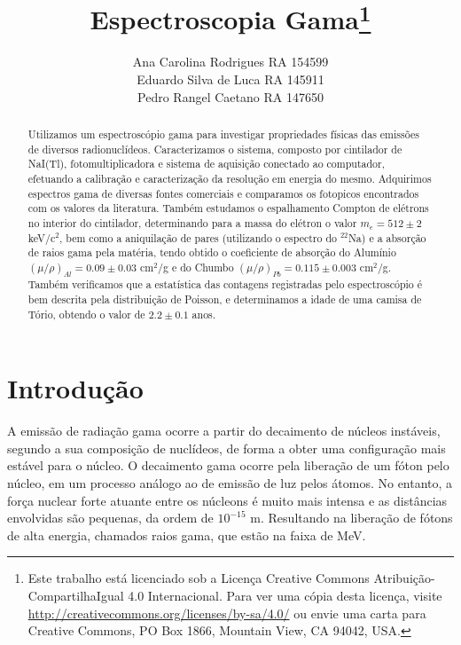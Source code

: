 \documentclass[a4paper, 11pt, notitlepage]{article}
\numberwithin{equation}{section}  %
\begin{document}
\title{Espectroscopia Gama\footnote{Este trabalho está licenciado sob a Licença Creative Commons Atribuição-CompartilhaIgual 4.0 Internacional. Para ver uma cópia desta licença, visite \url{http://creativecommons.org/licenses/by-sa/4.0/} ou envie uma carta para Creative Commons, PO Box 1866, Mountain View, CA 94042, USA.}}
\author{Ana Carolina Rodrigues RA 154599\\ Eduardo Silva de Luca RA 145911\\ Pedro Rangel Caetano RA 147650\\}

\maketitle

\begin{abstract}
Utilizamos um espectroscópio gama para investigar propriedades físicas das emissões de diversos radionuclídeos. Caracterizamos o sistema, composto por cintilador de NaI(Tl), fotomultiplicadora e sistema de aquisição conectado ao computador, efetuando a calibração e caracterização da resolução em energia do mesmo. Adquirimos espectros gama de diversas fontes comerciais e comparamos os fotopicos encontrados com os valores da literatura. Também estudamos o espalhamento Compton de elétrons no interior do cintilador, determinando para a massa do elétron o valor $m_e = 512 \pm 2$ keV/c$^2$, bem como a aniquilação de pares (utilizando o espectro do ${}^{22}$Na) e a absorção de raios gama pela matéria, tendo obtido o coeficiente de absorção do Alumínio $(\mu/\rho)_{Al} = 0.09 \pm 0.03$ cm$^2$/g e do Chumbo $(\mu/\rho)_{Pb} = 0.115 \pm 0.003$ cm$^2$/g. Também verificamos que a estatística das contagens registradas pelo espectroscópio é bem descrita pela distribuição de Poisson, e determinamos a idade de uma camisa de Tório, obtendo o valor de $2.2 \pm 0.1$ anos.
\end{abstract}

\section{\label{sec:intro}Introdução}
A emissão de radiação gama ocorre a partir do decaimento de núcleos instáveis, segundo a sua composição de nuclídeos, de forma a obter uma configuração mais estável para o núcleo. O decaimento gama ocorre pela liberação de um fóton pelo núcleo, em um processo análogo ao de emissão de luz pelos átomos. No entanto, a força nuclear forte atuante entre os núcleons é muito mais intensa e as distâncias envolvidas são pequenas, da ordem de $10^{-15}$ m. Resultando na liberação de fótons de alta energia, chamados raios gama, que estão na faixa de MeV. $
$
\end{document}

